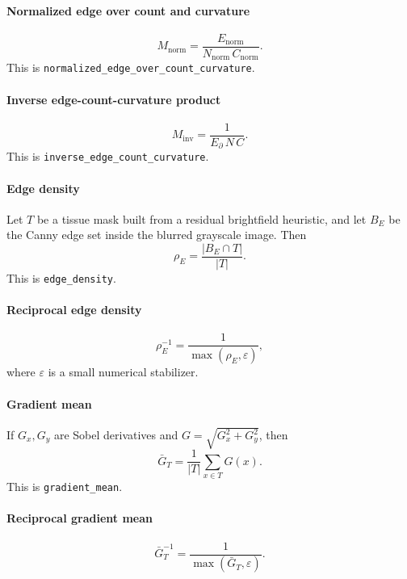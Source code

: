 \documentclass[11pt]{article}
\newcommand{\1}{\mathbf{1}}
\begin{document}
\paragraph{Normalized edge over count and curvature}
\begin{equation}
M_{\mathrm{norm}} = \frac{E_{\mathrm{norm}}}{N_{\mathrm{norm}}\,C_{\mathrm{norm}}}.
\end{equation}
This is \texttt{normalized\_edge\_over\_count\_curvature}.

\paragraph{Inverse edge-count-curvature product}
\begin{equation}
M_{\mathrm{inv}} = \frac{1}{E_{\partial}\,N\,C}.
\end{equation}
This is \texttt{inverse\_edge\_count\_curvature}.

\paragraph{Edge density}
Let $T$ be a tissue mask built from a residual brightfield heuristic, and let $B_E$ be the Canny edge set inside the blurred grayscale image. Then
\begin{equation}
\rho_E = \frac{|B_E \cap T|}{|T|}.
\end{equation}
This is \texttt{edge\_density}.

\paragraph{Reciprocal edge density}
\begin{equation}
\rho_E^{-1} = \frac{1}{\max(\rho_E,\varepsilon)},
\end{equation}
where $\varepsilon$ is a small numerical stabilizer.

\paragraph{Gradient mean}
If $G_x,G_y$ are Sobel derivatives and $G=\sqrt{G_x^2+G_y^2}$, then
\begin{equation}
\bar{G}_T = \frac{1}{|T|}\sum_{x\in T} G(x).
\end{equation}
This is \texttt{gradient\_mean}.

\paragraph{Reciprocal gradient mean}
\begin{equation}
\bar{G}_T^{-1} = \frac{1}{\max(\bar{G}_T,\varepsilon)}.
\end{equation}
\end{document}
